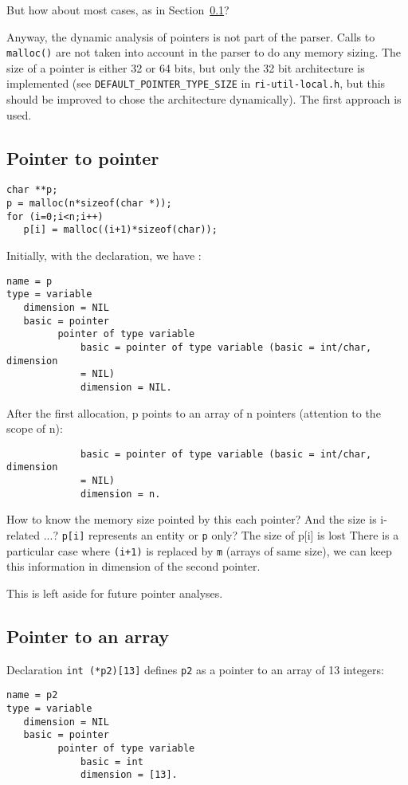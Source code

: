 \documentclass[a4paper]{report}
\begin{document}
But how about most cases, as in
 Section~\ref{subsection:pointer-to-pointer}?

Anyway, the dynamic analysis of pointers is not part of the
 parser. Calls to \verb/malloc()/ are not taken into account in the
 parser to do any memory sizing. The size of a pointer is either 32 or
 64 bits, but only the 32 bit architecture is implemented (see
 \verb/DEFAULT_POINTER_TYPE_SIZE/ in \verb/ri-util-local.h/, but this
 should be improved to chose the architecture dynamically). The first
 approach is used.

\subsection{Pointer to pointer}
\label{subsection:pointer-to-pointer}

\begin{lstlisting}
char **p;
p = malloc(n*sizeof(char *));
for (i=0;i<n;i++)
   p[i] = malloc((i+1)*sizeof(char));
\end{lstlisting}
Initially, with the declaration, we have :
\begin{verbatim}
name = p
type = variable
   dimension = NIL
   basic = pointer
         pointer of type variable
             basic = pointer of type variable (basic = int/char, dimension
             = NIL)
             dimension = NIL.
\end{verbatim}
After the first allocation, p points to an array of n pointers (attention
to the scope of n):
\begin{verbatim}
             basic = pointer of type variable (basic = int/char, dimension
             = NIL)
             dimension = n.
\end{verbatim}

How to know the memory size pointed by this each pointer? And the size
 is i-related ...? \lstinline/p[i]/ represents an entity or \lstinline/p/ only?
 The size of p[i] is lost There is a particular case where
 \lstinline/(i+1)/ is replaced by \lstinline/m/ (arrays of same size), we can
 keep this information in dimension of the second pointer.

This is left aside for future pointer analyses.

\subsection{Pointer to an array}

Declaration \lstinline/int (*p2)[13]/ defines \lstinline/p2/ as a
 pointer to an array of 13 integers:
\begin{verbatim}
name = p2
type = variable
   dimension = NIL
   basic = pointer
         pointer of type variable
             basic = int
             dimension = [13].
\end{verbatim}
\end{document}
